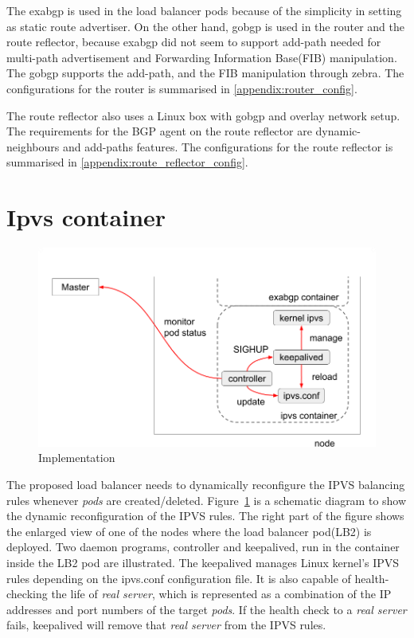 The exabgp is used in the load balancer pods because of the simplicity in setting as static route advertiser.
On the other hand, gobgp is used in the router and the route reflector, because exabgp did not seem to support add-path\cite{rfc7911} needed for multi-path advertisement and Forwarding Information Base(FIB) manipulation\cite{exa-networks_2018}.
The gobgp supports the add-path, and the FIB manipulation through zebra\cite{osrg_gobgp_zebra}.
The configurations for the router is summarised in \ref{appendix:router_config}.

The route reflector also uses a Linux box with gobgp and overlay network setup.
The requirements for the BGP agent on the route reflector are dynamic-neighbours and add-paths features.
The configurations for the route reflector is summarised in \ref{appendix:route_reflector_config}.

\section{Ipvs container}

\begin{figure}
\includegraphics[width=0.8\columnwidth]{Figs/ipvs-ingress-schem}
\caption{Implementation}
\label{fig:IPVS-ingress-schem}
\end{figure}

The proposed load balancer needs to dynamically reconfigure the IPVS balancing rules whenever {\em pods} are created/deleted. 
Figure~\ref{fig:IPVS-ingress-schem} is a schematic diagram to show the dynamic reconfiguration of the IPVS rules.
The right part of the figure shows the enlarged view of one of the nodes where the load balancer pod(LB2) is deployed.
Two daemon programs, controller and keepalived, run in the container inside the LB2 pod are illustrated.
The keepalived manages Linux kernel's IPVS rules depending on the ipvs.conf configuration file.
It is also capable of health-checking the life of {\em real server}, 
which is represented as a combination of the IP addresses and port numbers of the target {\em pods}. 
If the health check to a {\em real server} fails, keepalived will remove that {\em real server} from the IPVS rules.

